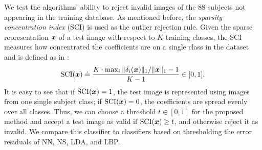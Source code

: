 \documentclass[10pt,journal,letterpaper,compsoc]{IEEEtran} %
\begin{document}
We test the algorithms' ability to reject invalid images of the
88 subjects not appearing in the training database. As
mentioned before, the \emph{sparsity concentration index} (SCI)
is used as the outlier rejection rule. Given the sparse
representation ${\boldsymbol{x}}$ of a test image with respect to $K$
training classes, the SCI measures how concentrated the
coefficients are on a single class in the dataset and is
defined as in \cite{Wright2009-PAMI}:
\begin{displaymath}
\textup{SCI}({\boldsymbol{x}}) \doteq \frac{K \cdot \max_i \|\delta_i({\boldsymbol{x}})\|_1 /
\|{\boldsymbol{x}}\|_1 - 1}{K - 1} \in [0,1] .
\end{displaymath}
It is easy to see that if $\textup{SCI}({\boldsymbol{x}}) = 1$, the test
image is represented using images from one single subject
class; if $\textup{SCI}({\boldsymbol{x}}) = 0$, the coefficients are spread
evenly over all classes. Thus, we can choose a threshold $t \in
[0,1]$ for the proposed method and accept a test image as valid
if $\textup{SCI}({\boldsymbol{x}}) \geq t$, and otherwise reject it as
invalid. We compare this classifier to classifiers based on
thresholding the error residuals of NN, NS, LDA, and LBP.
\end{document}
